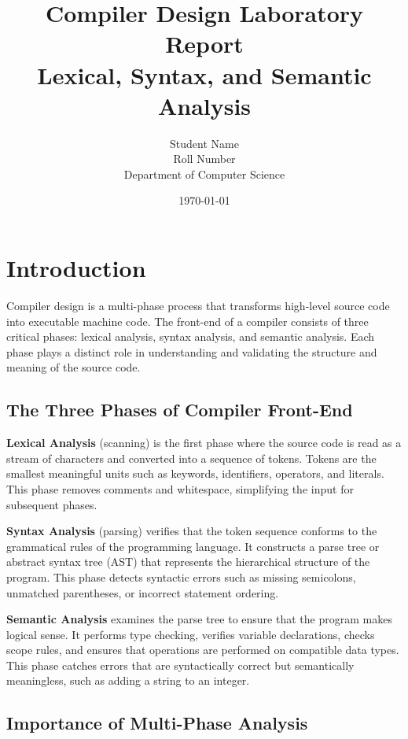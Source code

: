 \documentclass[12pt,a4paper]{article}
\title{\textbf{Compiler Design Laboratory Report} \\ 
\large Lexical, Syntax, and Semantic Analysis}
\author{Student Name \\ Roll Number \\ Department of Computer Science}
\date{\today}
\begin{document}
\maketitle
\thispagestyle{empty}

\newpage
\tableofcontents
\newpage

\section{Introduction}

Compiler design is a multi-phase process that transforms high-level source code into executable machine code. The front-end of a compiler consists of three critical phases: lexical analysis, syntax analysis, and semantic analysis. Each phase plays a distinct role in understanding and validating the structure and meaning of the source code.

\subsection{The Three Phases of Compiler Front-End}

\textbf{Lexical Analysis} (scanning) is the first phase where the source code is read as a stream of characters and converted into a sequence of tokens. Tokens are the smallest meaningful units such as keywords, identifiers, operators, and literals. This phase removes comments and whitespace, simplifying the input for subsequent phases.

\textbf{Syntax Analysis} (parsing) verifies that the token sequence conforms to the grammatical rules of the programming language. It constructs a parse tree or abstract syntax tree (AST) that represents the hierarchical structure of the program. This phase detects syntactic errors such as missing semicolons, unmatched parentheses, or incorrect statement ordering.

\textbf{Semantic Analysis} examines the parse tree to ensure that the program makes logical sense. It performs type checking, verifies variable declarations, checks scope rules, and ensures that operations are performed on compatible data types. This phase catches errors that are syntactically correct but semantically meaningless, such as adding a string to an integer.

\subsection{Importance of Multi-Phase Analysis}
\end{document}
